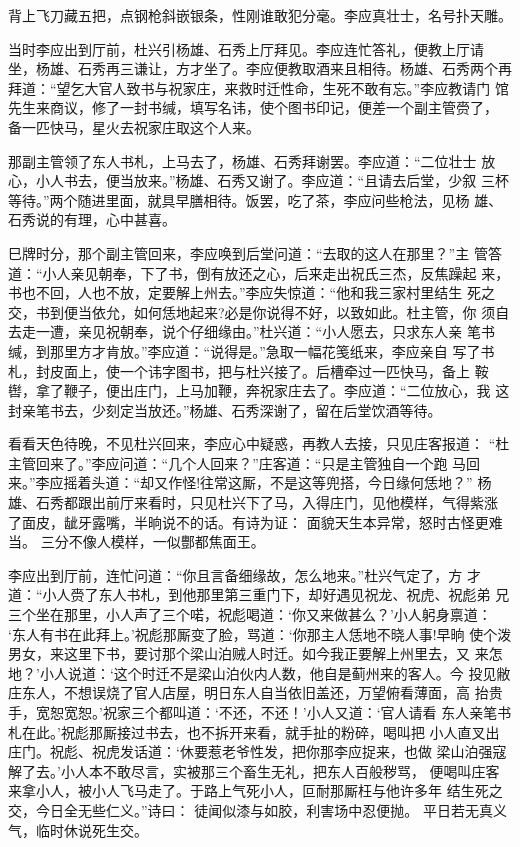 背上飞刀藏五把，点钢枪斜嵌银条，性刚谁敢犯分毫。李应真壮士，名号扑天雕。

当时李应出到厅前，杜兴引杨雄、石秀上厅拜见。李应连忙答礼，便教上厅请
坐，杨雄、石秀再三谦让，方才坐了。李应便教取酒来且相待。杨雄、石秀两个再
拜道：“望乞大官人致书与祝家庄，来救时迁性命，生死不敢有忘。”李应教请门
馆先生来商议，修了一封书缄，填写名讳，使个图书印记，便差一个副主管赍了，
备一匹快马，星火去祝家庄取这个人来。

那副主管领了东人书札，上马去了，杨雄、石秀拜谢罢。李应道：“二位壮士
放心，小人书去，便当放来。”杨雄、石秀又谢了。李应道：“且请去后堂，少叙
三杯等待。”两个随进里面，就具早膳相待。饭罢，吃了茶，李应问些枪法，见杨
雄、石秀说的有理，心中甚喜。

巳牌时分，那个副主管回来，李应唤到后堂问道：“去取的这人在那里？”主
管答道：“小人亲见朝奉，下了书，倒有放还之心，后来走出祝氏三杰，反焦躁起
来，书也不回，人也不放，定要解上州去。”李应失惊道：“他和我三家村里结生
死之交，书到便当依允，如何恁地起来?必是你说得不好，以致如此。杜主管，你
须自去走一遭，亲见祝朝奉，说个仔细缘由。”杜兴道：“小人愿去，只求东人亲
笔书缄，到那里方才肯放。”李应道：“说得是。”急取一幅花笺纸来，李应亲自
写了书札，封皮面上，使一个讳字图书，把与杜兴接了。后槽牵过一匹快马，备上
鞍辔，拿了鞭子，便出庄门，上马加鞭，奔祝家庄去了。李应道：“二位放心，我
这封亲笔书去，少刻定当放还。”杨雄、石秀深谢了，留在后堂饮酒等待。

看看天色待晚，不见杜兴回来，李应心中疑惑，再教人去接，只见庄客报道：
“杜主管回来了。”李应问道：“几个人回来？”庄客道：“只是主管独自一个跑
马回来。”李应摇着头道：“却又作怪!往常这厮，不是这等兜搭，今日缘何恁地？”
杨雄、石秀都跟出前厅来看时，只见杜兴下了马，入得庄门，见他模样，气得紫涨
了面皮，龇牙露嘴，半晌说不的话。有诗为证：
面貌天生本异常，怒时古怪更难当。
三分不像人模样，一似酆都焦面王。

李应出到厅前，连忙问道：“你且言备细缘故，怎么地来。”杜兴气定了，方
才道：“小人赍了东人书札，到他那里第三重门下，却好遇见祝龙、祝虎、祝彪弟
兄三个坐在那里，小人声了三个喏，祝彪喝道：‘你又来做甚么？’小人躬身禀道：
‘东人有书在此拜上。’祝彪那厮变了脸，骂道：‘你那主人恁地不晓人事!早晌
使个泼男女，来这里下书，要讨那个梁山泊贼人时迁。如今我正要解上州里去，又
来怎地？’小人说道：‘这个时迁不是梁山泊伙内人数，他自是蓟州来的客人。今
投见敝庄东人，不想误烧了官人店屋，明日东人自当依旧盖还，万望俯看薄面，高
抬贵手，宽恕宽恕。’祝家三个都叫道：‘不还，不还！’小人又道：‘官人请看
东人亲笔书札在此。’祝彪那厮接过书去，也不拆开来看，就手扯的粉碎，喝叫把
小人直叉出庄门。祝彪、祝虎发话道：‘休要惹老爷性发，把你那李应捉来，也做
梁山泊强寇解了去。’小人本不敢尽言，实被那三个畜生无礼，把东人百般秽骂，
便喝叫庄客来拿小人，被小人飞马走了。于路上气死小人，叵耐那厮枉与他许多年
结生死之交，今日全无些仁义。”诗曰：
徒闻似漆与如胶，利害场中忍便抛。
平日若无真义气，临时休说死生交。

